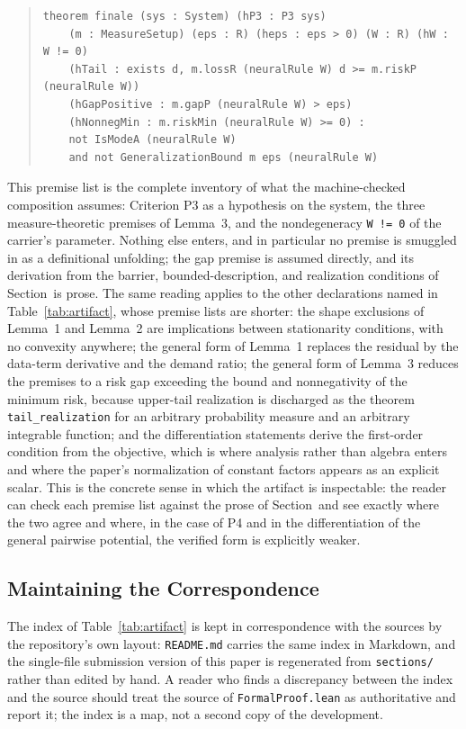 \begin{quote}
\small
\begin{verbatim}
theorem finale (sys : System) (hP3 : P3 sys)
    (m : MeasureSetup) (eps : R) (heps : eps > 0) (W : R) (hW : W != 0)
    (hTail : exists d, m.lossR (neuralRule W) d >= m.riskP (neuralRule W))
    (hGapPositive : m.gapP (neuralRule W) > eps)
    (hNonnegMin : m.riskMin (neuralRule W) >= 0) :
    not IsModeA (neuralRule W)
    and not GeneralizationBound m eps (neuralRule W)
\end{verbatim}
\end{quote}

This premise list is the complete inventory of what the machine-checked composition assumes: Criterion P3 as a hypothesis
on the system, the three measure-theoretic premises of Lemma~3, and the nondegeneracy \texttt{W != 0} of the carrier's
parameter. Nothing else enters, and in particular no premise is smuggled in as a definitional unfolding; the gap premise
is assumed directly, and its derivation from the barrier, bounded-description, and realization conditions of
Section~\pSecPfour is prose. The same reading applies to the other declarations named in Table~\ref{tab:artifact}, whose
premise lists are shorter: the shape exclusions of Lemma~1 and Lemma~2 are implications between stationarity conditions,
with no convexity anywhere; the general form of Lemma~1 replaces the residual by the data-term derivative and the demand
ratio; the general form of Lemma~3 reduces the premises to a risk gap exceeding the bound and nonnegativity of the minimum
risk, because upper-tail realization is discharged as the theorem \texttt{tail\_realization} for an arbitrary probability
measure and an arbitrary integrable function; and the differentiation statements derive the first-order condition from the
objective, which is where analysis rather than algebra enters and where the paper's normalization of constant factors
appears as an explicit scalar. This is the concrete sense in which the artifact is inspectable: the reader can check each
premise list against the prose of Section~\pSecFalsify and see exactly where the two agree and where, in the case of
P4 and in the differentiation of the general pairwise potential, the verified form is explicitly weaker.

\subsection{Maintaining the Correspondence}

The index of Table~\ref{tab:artifact} is kept in correspondence with the sources by the repository's own layout: \texttt{README.md} carries the same index in Markdown, and the single-file submission version of this paper is regenerated from \texttt{sections/} rather than edited by hand. A reader who finds a discrepancy between the index and the source should treat the source of \texttt{FormalProof.lean} as authoritative and report it; the index is a map, not a second copy of the development.